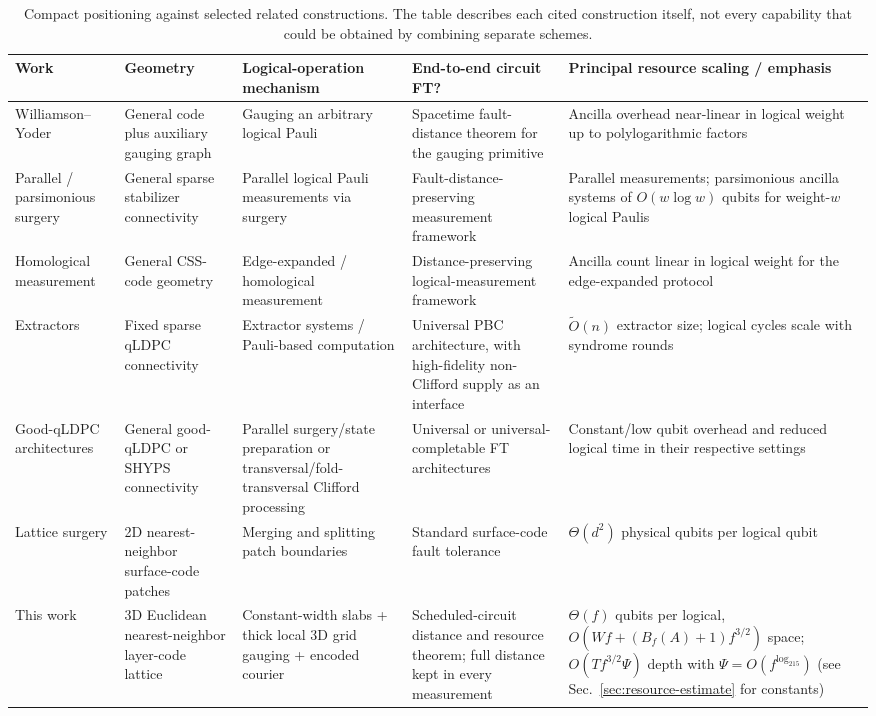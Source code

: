 \documentclass[aps,prx,reprint,superscriptaddress,nofootinbib,floatfix,longbibliography]{revtex4-2}
\theoremstyle{definition}
\begin{document}
\begin{table}[t]
\caption{Compact positioning against selected related constructions.  The table describes each cited construction itself, not every capability that could be obtained by combining separate schemes.}
\label{tab:comparison}
\scriptsize
\setlength{\tabcolsep}{4.2pt}
\renewcommand{\arraystretch}{1.14}
\begin{tabular}{@{}p{2.35cm}p{3.0cm}p{3.65cm}p{2.75cm}p{4.3cm}@{}}
\toprule
Work & Geometry & Logical-operation mechanism & End-to-end circuit FT? & Principal resource scaling / emphasis \\
\midrule
Williamson--Yoder \cite{WilliamsonYoderGauging} & General code plus auxiliary gauging graph & Gauging an arbitrary logical Pauli & Spacetime fault-distance theorem for the gauging primitive & Ancilla overhead near-linear in logical weight up to polylogarithmic factors \\
Parallel / parsimonious surgery \cite{CowtanParallelSurgery,YuanParsimonious2026} & General sparse stabilizer connectivity & Parallel logical Pauli measurements via surgery & Fault-distance-preserving measurement framework & Parallel measurements; parsimonious ancilla systems of $O(w\log w)$ qubits for weight-$w$ logical Paulis \\
Homological measurement \cite{IdeHomological} & General CSS-code geometry & Edge-expanded / homological measurement & Distance-preserving logical-measurement framework & Ancilla count linear in logical weight for the edge-expanded protocol \\
Extractors \cite{HeExtractors} & Fixed sparse qLDPC connectivity & Extractor systems / Pauli-based computation & Universal PBC architecture, with high-fidelity non-Clifford supply as an interface & $\widetilde O(n)$ extractor size; logical cycles scale with syndrome rounds \\
Good-qLDPC architectures \cite{ZhangGoodQLDPC,MalcolmEfficientQLDPC} & General good-qLDPC or SHYPS connectivity & Parallel surgery/state preparation or transversal/fold-transversal Clifford processing & Universal or universal-completable FT architectures & Constant/low qubit overhead and reduced logical time in their respective settings \\
Lattice surgery \cite{HorsmanLatticeSurgery,LitinskiSurgery} & 2D nearest-neighbor surface-code patches & Merging and splitting patch boundaries & Standard surface-code fault tolerance & $\Theta(d^2)$ physical qubits per logical qubit \\
This work & 3D Euclidean nearest-neighbor layer-code lattice & Constant-width slabs + thick local 3D grid gauging + encoded courier & Scheduled-circuit distance and resource theorem; full distance kept in every measurement & $\Theta(f)$ qubits per logical, $O(Wf+(B_f(A)+1)f^{3/2})$ space; $O(Tf^{3/2}\Psi)$ depth with $\Psi=O(f^{\log_215})$ (see Sec.~\ref{sec:resource-estimate} for constants) \\
\bottomrule
\end{tabular}
\end{table}
\end{document}

